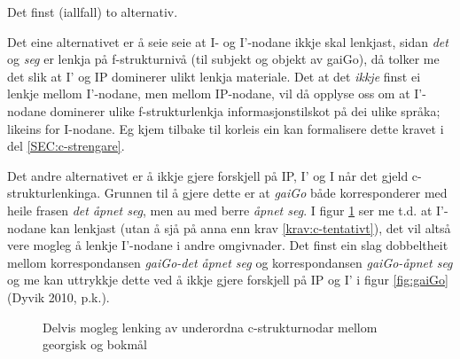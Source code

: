 \documentclass[12pt,a4paper,oneside,draft]{report}
\newcommand{\proj}[2]{\begin{tabular}{c}\footnotesize{#1}\\\normalsize{#2}\end{tabular}}
\newcommand{\ua}{\ensuremath{\uparrow}}
\newcommand{\da}{\ensuremath{\downarrow}}
\begin{document}
Det finst (iallfall) to alternativ. 

Det eine alternativet er å seie seie at I- og I'-nodane ikkje skal
 lenkjast, sidan \emph{det} og \emph{seg} er lenkja på f\hyp{}strukturnivå (til
 subjekt og objekt av gaiGo), då tolker me det slik at I' og IP
 dominerer ulikt lenkja materiale. Det at det \emph{ikkje} finst ei lenkje
 mellom I'-nodane, men mellom IP-nodane, vil då opplyse oss om at
 I'-nodane dominerer ulike f\hyp{}strukturlenkja informasjonstilskot på dei
 ulike språka; likeins for I-nodane. Eg kjem tilbake til korleis ein
 kan formalisere dette kravet i del \ref{SEC:c-strengare}.

Det andre alternativet er å ikkje gjere forskjell på IP, I' og I når
 det gjeld c\hyp{}strukturlenkinga. Grunnen til å gjere dette er at
 \emph{gaiGo} både korresponderer med heile frasen \emph{det åpnet seg}, men au
 med berre \emph{åpnet seg}.  I figur \ref{fig:PanJara-gaiGo} ser me
 t.d. at I'-nodane kan lenkjast (utan å sjå på anna enn krav
 \ref{krav:c-tentativt}), det vil altså vere mogleg å lenkje I'-nodane
 i andre omgivnader. Det finst ein slag dobbeltheit mellom
 korrespondansen \emph{gaiGo-det åpnet seg} og korrespondansen \emph{gaiGo-åpnet  seg} og me kan uttrykkje dette ved å ikkje gjere forskjell på IP og
 I' i figur \ref{fig:gaiGo} (Dyvik 2010, p.k.).

\begin{figure}[htp]
\centering
{}
\caption{Delvis mogleg lenking av underordna c\hyp{}strukturnodar mellom georgisk og bokmål}
 \label{fig:PanJara-gaiGo}
\end{figure}
\end{document}
